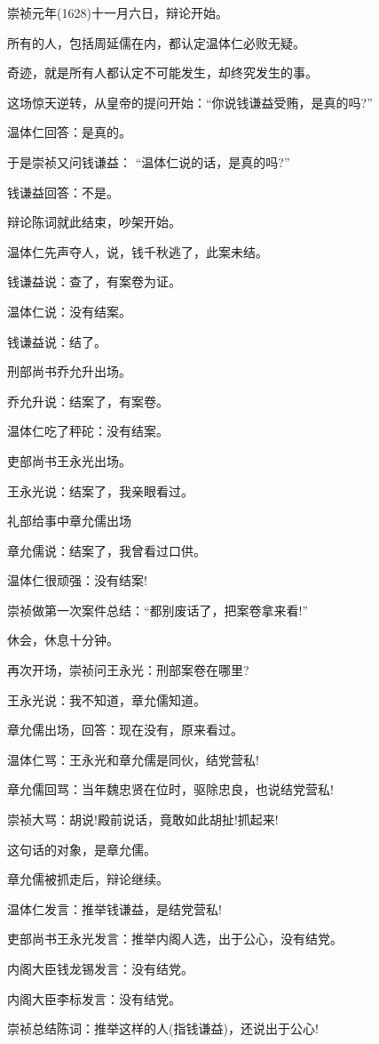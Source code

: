 \documentclass[11pt,a4paper,onecolumn]{article}
\begin{document}
崇祯元年(1628)十一月六日，辩论开始。

所有的人，包括周延儒在内，都认定温体仁必败无疑。

奇迹，就是所有人都认定不可能发生，却终究发生的事。

这场惊天逆转，从皇帝的提问开始：``你说钱谦益受贿，是真的吗?''

温体仁回答：是真的。

于是崇祯又问钱谦益： ``温体仁说的话，是真的吗?''

钱谦益回答：不是。

辩论陈词就此结束，吵架开始。

温体仁先声夺人，说，钱千秋逃了，此案未结。

钱谦益说：查了，有案卷为证。

温体仁说：没有结案。

钱谦益说：结了。

刑部尚书乔允升出场。

乔允升说：结案了，有案卷。

温体仁吃了秤砣：没有结案。

吏部尚书王永光出场。

王永光说：结案了，我亲眼看过。

礼部给事中章允儒出场

章允儒说：结案了，我曾看过口供。

温体仁很顽强：没有结案!

崇祯做第一次案件总结：``都别废话了，把案卷拿来看!''

休会，休息十分钟。

再次开场，崇祯问王永光：刑部案卷在哪里?

王永光说：我不知道，章允儒知道。

章允儒出场，回答：现在没有，原来看过。

温体仁骂：王永光和章允儒是同伙，结党营私!

章允儒回骂：当年魏忠贤在位时，驱除忠良，也说结党营私!

崇祯大骂：胡说!殿前说话，竟敢如此胡扯!抓起来!

这句话的对象，是章允儒。

章允儒被抓走后，辩论继续。

温体仁发言：推举钱谦益，是结党营私!

吏部尚书王永光发言：推举内阁人选，出于公心，没有结党。

内阁大臣钱龙锡发言：没有结党。

内阁大臣李标发言：没有结党。

崇祯总结陈词：推举这样的人(指钱谦益)，还说出于公心!
\end{document}
